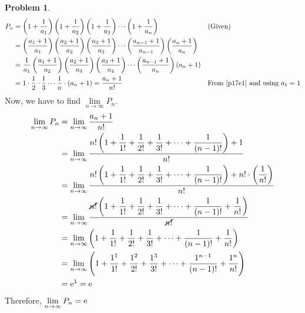 \documentclass[14]{article}
\theoremstyle{definition}
\newtheorem{prob}{Problem}
\theoremstyle{case}
\begin{document}
\begin{prob}
\begin{align*}
P_n &= \left(1 + \dfrac1{a_1}\right)\left(1 + \dfrac1{a_2}\right)\left(1 + \dfrac1{a_3}\right)\cdots\left(1 + \dfrac1{a_n}\right) && \text{(Given)}\\
&= \foreach \x in {1, 2, 3} {\left( \dfrac{a_{\x} + 1}{a_{\x}} \right)} \cdots \left( \dfrac{a_{n-1} + 1}{a_{n-1}} \right)\left( \dfrac{a_{n} + 1}{a_{n}} \right)\\
&= \dfrac1{a_1} \foreach \x in {1, 2, 3}{\left(\dfrac{a_{\x} + 1}{a_{{\pgfmathparse{int(\x + 1}\pgfmathresult}}}\right)} \cdots \left(\dfrac{a_{n-1} + 1}{a_n}\right)\left(a_n + 1\right)\\
&= 1 \cdot \dfrac12 \cdot \dfrac13 \cdots \dfrac1{n} \cdot (a_n + 1) = \dfrac{a_n + 1}{n!} && \text{From \eqref{p17e1} and using $a_1 = 1$}
\end{align*}
Now, we have to find $\lim\limits_{n \to \infty} P_n$.
\begin{align*}
\lim\limits_{n \to \infty} P_n &= \lim_{n \to \infty} \dfrac{a_n + 1}{n!}\\
&= \lim_{n \to \infty} \dfrac{n! \left( 1 + \dfrac1{1!} + \dfrac1{2!} + \dfrac1{3!} + \cdots + \dfrac1{(n-1)!} \right) + 1}{n!}\\
&= \lim_{n \to \infty} \dfrac{n! \left( 1 + \dfrac1{1!} + \dfrac1{2!} + \dfrac1{3!} + \cdots + \dfrac1{(n-1)!} \right) + n!\cdot \left(\dfrac1{n!}\right)}{n!}\\
&= \lim_{n \to \infty} \dfrac{\cancel{n!} \left( 1 + \dfrac1{1!} + \dfrac1{2!} + \dfrac1{3!} + \cdots + \dfrac1{(n-1)!} + \dfrac1{n!} \right)}{\cancel{n!}}\\
&= \lim_{n \to \infty}\left( 1 + \dfrac1{1!} + \dfrac1{2!} + \dfrac1{3!} + \cdots + \dfrac1{(n-1)!} + \dfrac1{n!} \right)\\
&= \lim_{n \to \infty}\left( 1 + \dfrac{1^1}{1!} + \dfrac{1^2}{2!} + \dfrac{1^3}{3!} + \cdots + \dfrac{1^{n-1}}{(n-1)!} + \dfrac{1^n}{n!} \right)\\
&= {\rm e}^1 = {\rm e}
\end{align*}
Therefore, $\lim\limits_{n \to \infty} P_n = {\rm e}$
\end{prob}
\end{document}
